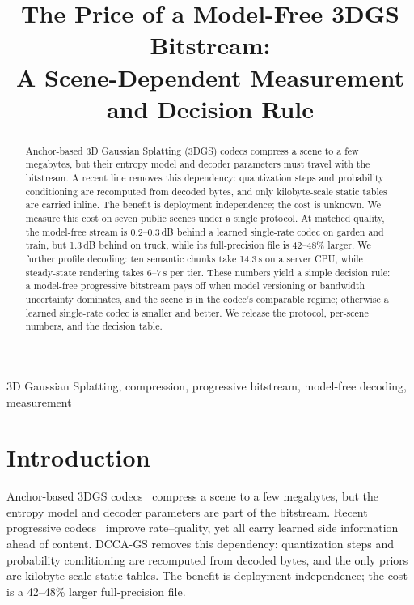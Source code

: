 \documentclass[conference]{IEEEtran}
\newcommand{\dcca}{DCCA-GS}
\begin{document}
\title{The Price of a Model-Free 3DGS Bitstream:\\
A Scene-Dependent Measurement and Decision Rule}

\author{
}

\maketitle

\begin{abstract}
Anchor-based 3D Gaussian Splatting (3DGS) codecs compress a scene to a few megabytes, but their entropy model and decoder parameters must travel with the bitstream. A recent line removes this dependency: quantization steps and probability conditioning are recomputed from decoded bytes, and only kilobyte-scale static tables are carried inline. The benefit is deployment independence; the cost is unknown. We measure this cost on seven public scenes under a single protocol. At matched quality, the model-free stream is 0.2--0.3\,dB behind a learned single-rate codec on garden and train, but 1.3\,dB behind on truck, while its full-precision file is 42--48\% larger. We further profile decoding: ten semantic chunks take 14.3\,s on a server CPU, while steady-state rendering takes 6--7\,s per tier. These numbers yield a simple decision rule: a model-free progressive bitstream pays off when model versioning or bandwidth uncertainty dominates, and the scene is in the codec's comparable regime; otherwise a learned single-rate codec is smaller and better. We release the protocol, per-scene numbers, and the decision table.
\end{abstract}

\begin{IEEEkeywords}
3D Gaussian Splatting, compression, progressive bitstream, model-free decoding, measurement
\end{IEEEkeywords}

\section{Introduction}
\label{sec:intro}
Anchor-based 3DGS codecs~\cite{lu2024,chen2024,chen2025} compress a scene to a few megabytes, but the entropy model and decoder parameters are part of the bitstream. Recent progressive codecs~\cite{chen2026pcgs,tang2026progs,revilla2026scar,disario2025gode} improve rate--quality, yet all carry learned side information ahead of content. \dcca{} removes this dependency: quantization steps and probability conditioning are recomputed from decoded bytes, and the only priors are kilobyte-scale static tables. The benefit is deployment independence; the cost is a 42--48\% larger full-precision file.
\end{document}
